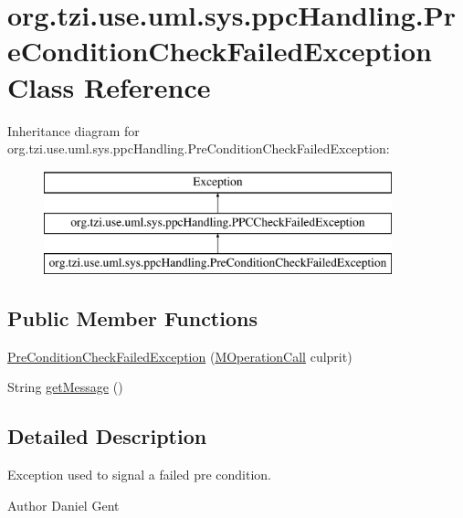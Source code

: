 \hypertarget{classorg_1_1tzi_1_1use_1_1uml_1_1sys_1_1ppc_handling_1_1_pre_condition_check_failed_exception}{\section{org.\-tzi.\-use.\-uml.\-sys.\-ppc\-Handling.\-Pre\-Condition\-Check\-Failed\-Exception Class Reference}
\label{classorg_1_1tzi_1_1use_1_1uml_1_1sys_1_1ppc_handling_1_1_pre_condition_check_failed_exception}
}
Inheritance diagram for org.\-tzi.\-use.\-uml.\-sys.\-ppc\-Handling.\-Pre\-Condition\-Check\-Failed\-Exception\-:\begin{figure}[H]
\begin{center}
\leavevmode
\includegraphics[height=3.000000cm]{classorg_1_1tzi_1_1use_1_1uml_1_1sys_1_1ppc_handling_1_1_pre_condition_check_failed_exception}
\end{center}
\end{figure}
\subsection*{Public Member Functions}
\begin{DoxyCompactItemize}
\item 
\hyperlink{classorg_1_1tzi_1_1use_1_1uml_1_1sys_1_1ppc_handling_1_1_pre_condition_check_failed_exception_a815c6283404abd19b3e084e5c06aece0}{Pre\-Condition\-Check\-Failed\-Exception} (\hyperlink{classorg_1_1tzi_1_1use_1_1uml_1_1sys_1_1_m_operation_call}{M\-Operation\-Call} culprit)
\item 
String \hyperlink{classorg_1_1tzi_1_1use_1_1uml_1_1sys_1_1ppc_handling_1_1_pre_condition_check_failed_exception_a2fb4d26b8ef6f27132ea52f3ad666d6d}{get\-Message} ()
\end{DoxyCompactItemize}


\subsection{Detailed Description}
Exception used to signal a failed pre condition. \begin{DoxyAuthor}{Author}
Daniel Gent 
\end{DoxyAuthor}


